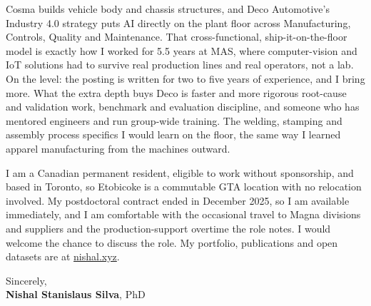 \documentclass[11pt]{article}
\newcommand{\clName}{Nishal Stanislaus Silva}
\newcommand{\clSite}{https://nishal.xyz}
\begin{document}
Cosma builds vehicle body and chassis structures, and Deco Automotive's Industry 4.0 strategy puts AI directly on the plant floor across Manufacturing, Controls, Quality and Maintenance. That cross-functional, ship-it-on-the-floor model is exactly how I worked for 5.5 years at MAS, where computer-vision and IoT solutions had to survive real production lines and real operators, not a lab. On the level: the posting is written for two to five years of experience, and I bring more. What the extra depth buys Deco is faster and more rigorous root-cause and validation work, benchmark and evaluation discipline, and someone who has mentored engineers and run group-wide training. The welding, stamping and assembly process specifics I would learn on the floor, the same way I learned apparel manufacturing from the machines outward.

I am a Canadian permanent resident, eligible to work without sponsorship, and based in Toronto, so Etobicoke is a commutable GTA location with no relocation involved. My postdoctoral contract ended in December 2025, so I am available immediately, and I am comfortable with the occasional travel to Magna divisions and suppliers and the production-support overtime the role notes. I would welcome the chance to discuss the role. My portfolio, publications and open datasets are at \href{\clSite}{nishal.xyz}.

\vspace{10pt}
Sincerely,\\[2pt]
\textbf{\clName}, PhD
\end{document}

